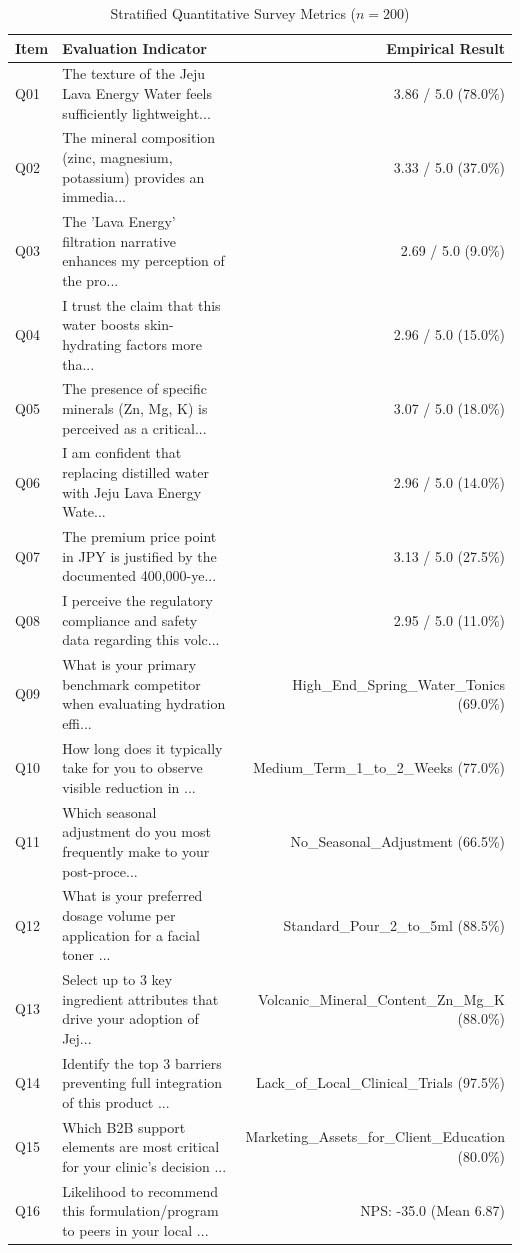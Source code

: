 \documentclass[10pt,twocolumn,a4paper]{article}
\begin{document}
\begin{table}[t]
\centering
\caption{Stratified Quantitative Survey Metrics ($n = 200$)}
\label{tab:metrics}
\small
\begin{tabularx}{\textwidth}{l X r}
\toprule
\textbf{Item} & \textbf{Evaluation Indicator} & \textbf{Empirical Result} \\
\midrule
Q01 & The texture of the Jeju Lava Energy Water feels sufficiently lightweight... & 3.86 / 5.0 (78.0\%) \\
Q02 & The mineral composition (zinc, magnesium, potassium) provides an immedia... & 3.33 / 5.0 (37.0\%) \\
Q03 & The 'Lava Energy' filtration narrative enhances my perception of the pro... & 2.69 / 5.0 (9.0\%) \\
Q04 & I trust the claim that this water boosts skin-hydrating factors more tha... & 2.96 / 5.0 (15.0\%) \\
Q05 & The presence of specific minerals (Zn, Mg, K) is perceived as a critical... & 3.07 / 5.0 (18.0\%) \\
Q06 & I am confident that replacing distilled water with Jeju Lava Energy Wate... & 2.96 / 5.0 (14.0\%) \\
Q07 & The premium price point in JPY is justified by the documented 400,000-ye... & 3.13 / 5.0 (27.5\%) \\
Q08 & I perceive the regulatory compliance and safety data regarding this volc... & 2.95 / 5.0 (11.0\%) \\
Q09 & What is your primary benchmark competitor when evaluating hydration effi... & High\_End\_Spring\_Water\_Tonics (69.0\%) \\
Q10 & How long does it typically take for you to observe visible reduction in ... & Medium\_Term\_1\_to\_2\_Weeks (77.0\%) \\
Q11 & Which seasonal adjustment do you most frequently make to your post-proce... & No\_Seasonal\_Adjustment (66.5\%) \\
Q12 & What is your preferred dosage volume per application for a facial toner ... & Standard\_Pour\_2\_to\_5ml (88.5\%) \\
Q13 & Select up to 3 key ingredient attributes that drive your adoption of Jej... & Volcanic\_Mineral\_Content\_Zn\_Mg\_K (88.0\%) \\
Q14 & Identify the top 3 barriers preventing full integration of this product ... & Lack\_of\_Local\_Clinical\_Trials (97.5\%) \\
Q15 & Which B2B support elements are most critical for your clinic's decision ... & Marketing\_Assets\_for\_Client\_Education (80.0\%) \\
Q16 & Likelihood to recommend this formulation/program to peers in your local ... & NPS: -35.0 (Mean 6.87) \\
\bottomrule
\end{tabularx}
\end{table}
\end{document}
